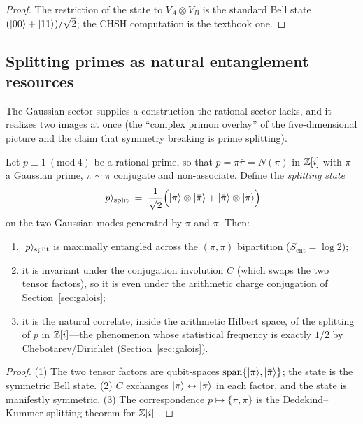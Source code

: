 \begin{proof}
The restriction of the state to $V_{A}\otimes V_{B}$ is the standard Bell state
$(\lvert 00\rangle+\lvert 11\rangle)/\sqrt2$; the CHSH computation is the textbook one.
\end{proof}

\subsection{Splitting primes as natural entanglement resources}

The Gaussian sector supplies a construction the rational sector lacks, and it realizes two
images at once (the ``complex primon overlay'' of the five-dimensional
picture and the claim that symmetry breaking is prime splitting).

\begin{proposition}\label{prop:splitting}
Let $p\equiv1\ (\mathrm{mod}\ 4)$ be a rational prime, so that
$p=\pi\bar\pi=N(\pi)$ in $\mathbb{Z}[i]$ with $\pi$ a Gaussian prime, $\pi\sim\bar\pi$ conjugate and
non-associate. Define the \emph{splitting state}
\begin{equation}
\lvert p\rangle_{\mathrm{split}}
\;=\;\frac{1}{\sqrt2}\Bigl(\lvert \pi\rangle\otimes\lvert \bar\pi\rangle
+\lvert \bar\pi\rangle\otimes\lvert \pi\rangle\Bigr)
\end{equation}
on the two Gaussian modes generated by $\pi$ and $\bar\pi$. Then:
\begin{enumerate}[leftmargin=1.6em]
\item $\lvert p\rangle_{\mathrm{split}}$ is maximally entangled across the
$(\pi,\bar\pi)$ bipartition ($S_{\mathrm{ent}}=\log2$);
\item it is invariant under the conjugation involution $C$ (which swaps the two tensor
factors), so it is even under the arithmetic charge conjugation of
Section~\ref{sec:galois};
\item it is the natural correlate, inside the arithmetic Hilbert space, of the splitting of
$p$ in $\mathbb{Z}[i]$---the phenomenon whose statistical frequency is exactly $1/2$ by
Chebotarev/Dirichlet (Section~\ref{sec:galois}).
\end{enumerate}
\end{proposition}

\begin{proof}
(1) The two tensor factors are qubit-spaces $\mathrm{span}\{\lvert \pi\rangle,\lvert \bar\pi\rangle\}$; the
state is the symmetric Bell state. (2) $C$ exchanges $\lvert \pi\rangle\leftrightarrow
\lvert \bar\pi\rangle$ in each factor, and the state is manifestly symmetric. (3) The correspondence
$p\mapsto\{\pi,\bar\pi\}$ is the Dedekind--Kummer splitting theorem for $\mathbb{Z}[i]$
\cite{neukirch1999}.
\end{proof}

